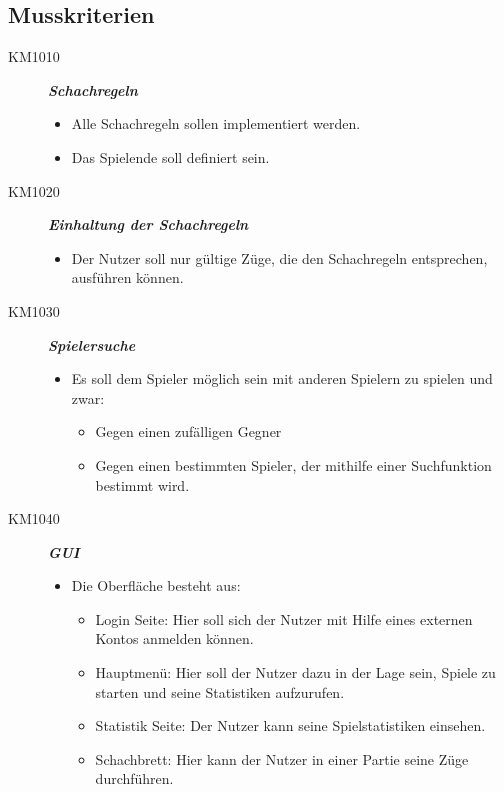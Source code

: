 \documentclass[parskip=full]{scrartcl}
\begin{document}
\subsection{Musskriterien}
\begin{description}
\item[KM1010] \textbf{\textit{\gls{Schachregeln}}}
\begin{itemize}
	\item Alle \gls{Schachregeln} sollen implementiert werden.
	\item Das Spielende soll definiert sein.	
\end{itemize}
\item[KM1020] \textbf{\textit{Einhaltung der \gls{Schachregeln}}}
\begin{itemize}
	\item Der Nutzer soll nur gültige Züge, die den \gls{Schachregeln} entsprechen, ausführen können.
\end{itemize}
\item[KM1030] \textbf{\textit{Spielersuche}}
\begin{itemize}
	\item Es soll dem Spieler möglich sein mit anderen Spielern zu spielen und zwar:
	\begin{itemize}
		\item Gegen einen zufälligen Gegner
		\item Gegen einen bestimmten Spieler, der mithilfe einer Suchfunktion bestimmt wird.
	\end{itemize}
\end{itemize}
\item[KM1040] \textbf{\textit{\gls{GUI}}}
\begin{itemize}
	\item Die Oberfläche besteht aus:
	\begin{itemize}		
		\item Login Seite: Hier soll sich der Nutzer mit Hilfe eines externen Kontos anmelden können.
		
		\item Hauptmenü: Hier soll der Nutzer dazu in der Lage sein, Spiele zu starten und seine Statistiken aufzurufen.
		
		\item Statistik Seite: Der Nutzer kann seine Spielstatistiken einsehen.
		
		\item Schachbrett: Hier kann der Nutzer in einer Partie seine Züge durchführen.
		

\end{itemize}
\end{itemize}
\end{description}
\end{document}
